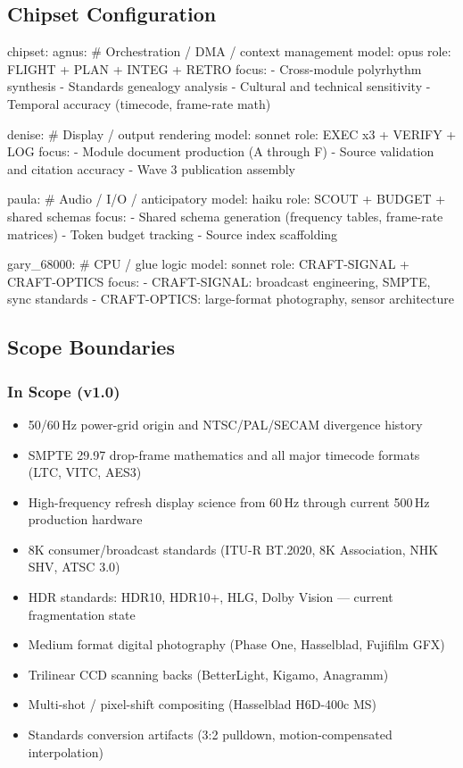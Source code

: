 \documentclass[11pt,letterpaper]{article}
\begin{document}
\subsection{Chipset Configuration}

\begin{asciibox}
chipset:
  agnus:            # Orchestration / DMA / context management
    model: opus
    role: FLIGHT + PLAN + INTEG + RETRO
    focus:
      - Cross-module polyrhythm synthesis
      - Standards genealogy analysis
      - Cultural and technical sensitivity
      - Temporal accuracy (timecode, frame-rate math)

  denise:           # Display / output rendering
    model: sonnet
    role: EXEC x3 + VERIFY + LOG
    focus:
      - Module document production (A through F)
      - Source validation and citation accuracy
      - Wave 3 publication assembly

  paula:            # Audio / I/O / anticipatory
    model: haiku
    role: SCOUT + BUDGET + shared schemas
    focus:
      - Shared schema generation (frequency tables, frame-rate matrices)
      - Token budget tracking
      - Source index scaffolding

  gary_68000:       # CPU / glue logic
    model: sonnet
    role: CRAFT-SIGNAL + CRAFT-OPTICS
    focus:
      - CRAFT-SIGNAL: broadcast engineering, SMPTE, sync standards
      - CRAFT-OPTICS: large-format photography, sensor architecture
\end{asciibox}

\subsection{Scope Boundaries}

\subsubsection{In Scope (v1.0)}
\begin{itemize}[leftmargin=*]
  \item 50/60\,Hz power-grid origin and NTSC/PAL/SECAM divergence history
  \item SMPTE 29.97 drop-frame mathematics and all major timecode formats (LTC, VITC, AES3)
  \item High-frequency refresh display science from 60\,Hz through current 500\,Hz production hardware
  \item 8K consumer/broadcast standards (ITU-R BT.2020, 8K Association, NHK SHV, ATSC 3.0)
  \item HDR standards: HDR10, HDR10+, HLG, Dolby Vision --- current fragmentation state
  \item Medium format digital photography (Phase One, Hasselblad, Fujifilm GFX)
  \item Trilinear CCD scanning backs (BetterLight, Kigamo, Anagramm)
  \item Multi-shot / pixel-shift compositing (Hasselblad H6D-400c MS)
  \item Standards conversion artifacts (3:2 pulldown, motion-compensated interpolation)
\end{itemize}
\end{document}
